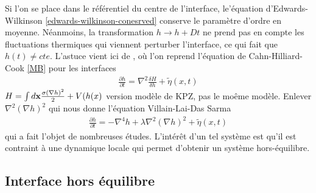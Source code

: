 Si l'on se place dans le référentiel du centre de l'interface, le'équation d'Edwards-Wilkinson \ref{edwards-wilkinson-conesrved} conserve le paramètre d'ordre en moyenne. Néanmoins, la transformation $h \rightarrow h + Dt$ ne prend pas en compte les fluctuations thermiques qui viennent perturber l'interface, ce qui fait que $h(t) \neq cte$. L'astuce vient ici de \cite{kawasaki_diffusion_1966,kawasaki_correlation-function_1966}, où l'on reprend l'équation de Cahn-Hilliard-Cook \ref{MB} pour les interfaces
\begin{align}
    \frac{\partial h}{\partial t} =  \nabla^2 \frac{\delta H}{\delta h} +  \tilde{\eta}(x,t)
\end{align}
{\color{red}$ H =\int d {\bf x} \frac{\sigma (\nabla h)^2}{2} +V(h(x) $}
{\color{red} version modèle de KPZ, pas le moême modèle. Enlever $\nabla^2 (\nabla h)^2$}
qui nous donne l'équation Villain-Lai-Das Sarma\cite{villain_continuum_1991,lai_kinetic_1991}
\begin{align}
    \frac{\partial h}{\partial t} = - \nabla^4 h + \lambda \nabla^2 (\nabla h) ^2 +  \tilde{\eta}(x,t)
\end{align}
qui a fait l'objet de nombreuses études\cite{kim_conserved_1994,assis_dynamic_2015,oliveira_maximal-_2008,singha_renormalization_2016}.
L'intérêt d'un tel système est qu'il est contraint à une dynamique locale qui permet d'obtenir un système hors-équilibre. 

    \subsection{Interface hors équilibre}

